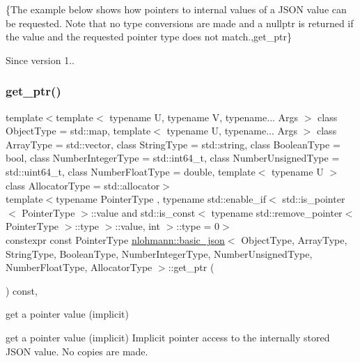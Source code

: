 \{The example below shows how pointers to internal values of a J\+S\+ON value can be requested. Note that no type conversions are made and a {\ttfamily nullptr} is returned if the value and the requested pointer type does not match.,get\+\_\+ptr\}

\begin{DoxySince}{Since}
version 1.. 
\end{DoxySince}
\hypertarget{classnlohmann_1_1basic__json_a9780ea9bb66b6191cb087b14396972c1}{}\label{classnlohmann_1_1basic__json_a9780ea9bb66b6191cb087b14396972c1} 
\subsubsection{\texorpdfstring{get\+\_\+ptr()}{get\_ptr()}\hspace{0.1cm}{\footnotesize\ttfamily [2/2]}}
{\footnotesize\ttfamily template$<$template$<$ typename U, typename V, typename... Args $>$ class Object\+Type = std\+::map, template$<$ typename U, typename... Args $>$ class Array\+Type = std\+::vector, class String\+Type  = std\+::string, class Boolean\+Type  = bool, class Number\+Integer\+Type  = std\+::int64\+\_\+t, class Number\+Unsigned\+Type  = std\+::uint64\+\_\+t, class Number\+Float\+Type  = double, template$<$ typename U $>$ class Allocator\+Type = std\+::allocator$>$ \\
template$<$typename Pointer\+Type , typename std\+::enable\+\_\+if$<$ std\+::is\+\_\+pointer$<$ Pointer\+Type $>$\+::value and std\+::is\+\_\+const$<$ typename std\+::remove\+\_\+pointer$<$ Pointer\+Type $>$\+::type $>$\+::value, int $>$\+::type  = 0$>$ \\
constexpr const Pointer\+Type \hyperlink{classnlohmann_1_1basic__json}{nlohmann\+::basic\+\_\+json}$<$ Object\+Type, Array\+Type, String\+Type, Boolean\+Type, Number\+Integer\+Type, Number\+Unsigned\+Type, Number\+Float\+Type, Allocator\+Type $>$\+::get\+\_\+ptr (\begin{DoxyParamCaption}{ }\end{DoxyParamCaption}) const\hspace{0.3cm}{\ttfamily [inline]}, {\ttfamily [noexcept]}}



get a pointer value (implicit) 

get a pointer value (implicit) Implicit pointer access to the internally stored J\+S\+ON value. No copies are made.

